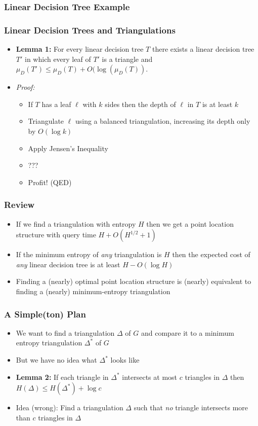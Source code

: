 \documentclass{beamer}
\begin{document}
\frame
{
	\frametitle{Linear Decision Tree Example}
}

\frame
{
   \frametitle{Linear Decision Trees and Triangulations}
   \begin{itemize}
     \item<1->
     \textbf{Lemma 1:}
       For every linear decision tree $T$ there exists a linear
decision tree $T'$ in which every leaf of $T'$ is a triangle and 
$\mu_D(T') \le \mu_D(T) + O(\log(\mu_D(T))$.
     \item<2-> \textit{Proof:}
      \begin{itemize}
        \item<3-> If $T$ has a leaf $\ell$ with $k$ sides then
          the depth of $\ell$ in $T$ is at least $k$ 
        \item<4-> Triangulate $\ell$ using a balanced triangulation,
increasing its depth only by $O(\log k)$
        \item<5-> Apply Jensen's Inequality
        \item<6-> ???
        \item<7-> Profit! (QED)
     \end{itemize}
   \end{itemize}
}

\frame
{
   \frametitle{Review}

   \begin{itemize}
     \item<1-> If we find a triangulation with entropy $H$ then we get a
point location structure with query time $H+O(H^{1/2}+1)$
     \item<2-> If the minimum entropy of \emph{any} triangulation is $H$
then the expected cost of \emph{any} linear decision tree is at least
$H-O(\log H)$
     \item<3-> Finding a (nearly) optimal point location structure is
(nearly) equivalent to finding a (nearly) minimum-entropy triangulation
   \end{itemize} 
}

\frame
{
    \frametitle{A Simple(ton) Plan}

    \begin{itemize}
      \item<1-> We want to find a triangulation $\Delta$ of $G$ and compare it to
a minimum entropy triangulation $\Delta^*$ of $G$
      \item<2-> But we have no idea what $\Delta^*$ looks like
      \item<3-> \textbf{Lemma 2:} If each triangle in $\Delta^*$ intersects
at most $c$ triangles in $\Delta$ then $H(\Delta) \le H(\Delta^*)+\log c$
      \item<4-> Idea (wrong): Find a triangulation $\Delta$ such that \emph{no}
 triangle intersects more than $c$ triangles in $\Delta$
    \end{itemize}	
}
\end{document}
